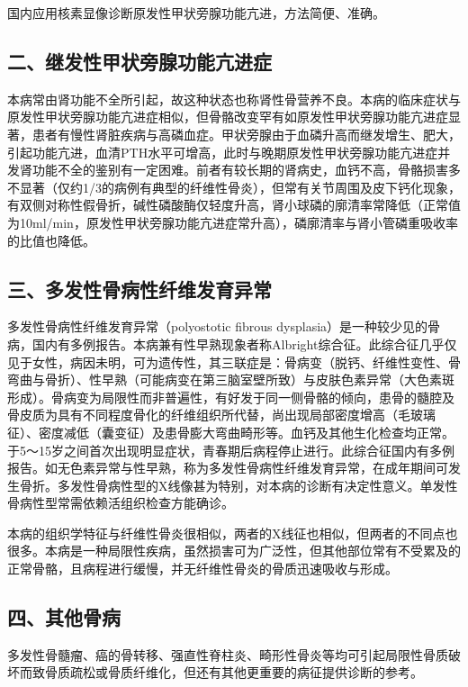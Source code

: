国内应用核素显像诊断原发性甲状旁腺功能亢进，方法简便、准确。

\subsection{二、继发性甲状旁腺功能亢进症}

本病常由肾功能不全所引起，故这种状态也称肾性骨营养不良。本病的临床症状与原发性甲状旁腺功能亢进症相似，但骨骼改变罕有如原发性甲状旁腺功能亢进症显著，患者有慢性肾脏疾病与高磷血症。甲状旁腺由于血磷升高而继发增生、肥大，引起功能亢进，血清PTH水平可增高，此时与晚期原发性甲状旁腺功能亢进症并发肾功能不全的鉴别有一定困难。前者有较长期的肾病史，血钙不高，骨骼损害多不显著（仅约1/3的病例有典型的纤维性骨炎），但常有关节周围及皮下钙化现象，有双侧对称性假骨折，碱性磷酸酶仅轻度升高，肾小球磷的廓清率常降低（正常值为10ml/min，原发性甲状旁腺功能亢进症常升高），磷廓清率与肾小管磷重吸收率的比值也降低。

\subsection{三、多发性骨病性纤维发育异常}

多发性骨病性纤维发育异常（polyostotic fibrous
dysplasia）是一种较少见的骨病，国内有多例报告。本病兼有性早熟现象者称Albright综合征。此综合征几乎仅见于女性，病因未明，可为遗传性，其三联症是：骨病变（脱钙、纤维性变性、骨弯曲与骨折）、性早熟（可能病变在第三脑室壁所致）与皮肤色素异常（大色素斑形成）。骨病变为局限性而非普遍性，有好发于同一侧骨骼的倾向，患骨的髓腔及骨皮质为具有不同程度骨化的纤维组织所代替，尚出现局部密度增高（毛玻璃征）、密度减低（囊变征）及患骨膨大弯曲畸形等。血钙及其他生化检查均正常。于5～15岁之间首次出现明显症状，青春期后病程停止进行。此综合征国内有多例报告。如无色素异常与性早熟，称为多发性骨病性纤维发育异常，在成年期间可发生骨折。多发性骨病性型的X线像甚为特别，对本病的诊断有决定性意义。单发性骨病性型常需依赖活组织检查方能确诊。

本病的组织学特征与纤维性骨炎很相似，两者的X线征也相似，但两者的不同点也很多。本病是一种局限性疾病，虽然损害可为广泛性，但其他部位常有不受累及的正常骨骼，且病程进行缓慢，并无纤维性骨炎的骨质迅速吸收与形成。

\subsection{四、其他骨病}

多发性骨髓瘤、癌的骨转移、强直性脊柱炎、畸形性骨炎等均可引起局限性骨质破坏而致骨质疏松或骨质纤维化，但还有其他更重要的病征提供诊断的参考。

